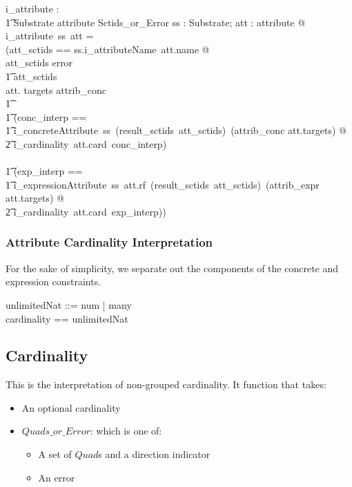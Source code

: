\documentclass{article}
\begin{document}
\begin{gendef}
   i\_attribute : \\
\t1 Substrate  \fun attribute \fun Sctids\_or\_Error
\where
   \forall ss : Substrate; att : attribute @ \\
   i\_attribute~ss~att = \\
   (\LET att\_sctids == ss.i\_attributeName~att.name @ \\
   \IF att\_sctids \in \ran error \\
\t1 \THEN att\_sctids \\
   \ELSE \IF att. targets \in \ran attrib\_conc \\
\t1 \THEN \\
\t1 (\LET conc\_interp == \\
\t1 i\_concreteAttribute~ss~(result\_sctids~att\_sctids)~(attrib\_conc \inv att.targets) @ \\
\t2 i\_cardinality~att.card~conc\_interp) \\
   \ELSE  \\
\t1 (\LET exp\_interp == \\
\t1 i\_expressionAttribute~ss~att.rf~(result\_sctids~att\_sctids)~(attrib\_expr \inv att.targets) @ \\
\t2 i\_cardinality~att.card~exp\_interp))
\end{gendef}


\subsubsection{Attribute Cardinality Interpretation}
For the sake of simplicity, we separate out the components of the concrete and expression constraints.

\begin{zed}
unlimitedNat ::= num \ldata \nat \rdata | many \\
cardinality == \nat \cross unlimitedNat \\
\end{zed}

\subsection{Cardinality}
This is the interpretation of non-grouped cardinality.   It function that takes:
\begin{itemize}[noitemsep,nolistsep]
\item An optional cardinality
\item $Quads\_or\_Error$: which is one of:
\begin{itemize}[noitemsep,nolistsep]
\item A set of $Quad$s and a direction indicator
\item An error
\end{itemize}
\end{itemize}
\end{document}
